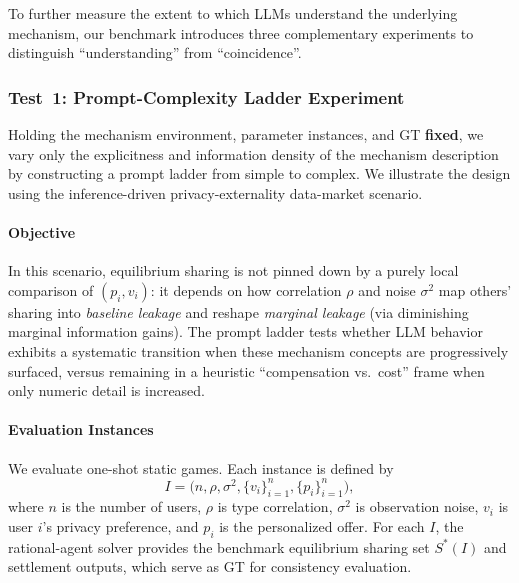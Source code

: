 \documentclass[sigconf,anonymous,review]{acmart}
\theoremstyle{definition}
\begin{document}
To further measure the extent to which LLMs understand the underlying mechanism, our benchmark introduces three complementary experiments to distinguish ``understanding'' from ``coincidence''.

\subsubsection{\textbf{Test~1: Prompt-Complexity Ladder Experiment}}
\label{subsubsec:rq1}

Holding the mechanism environment, parameter instances, and GT \textbf{fixed}, we vary only the explicitness and information density of the mechanism description by constructing a prompt ladder from simple to complex. We illustrate the design using the inference-driven privacy-externality data-market scenario.

\paragraph{\textbf{Objective}}
In this scenario, equilibrium sharing is not pinned down by a purely local comparison of $(p_i,v_i)$: it depends on how correlation $\rho$ and noise $\sigma^2$ map others' sharing into \emph{baseline leakage} and reshape \emph{marginal leakage} (via diminishing marginal information gains). The prompt ladder tests whether LLM behavior exhibits a systematic transition when these mechanism concepts are progressively surfaced, versus remaining in a heuristic ``compensation vs.\ cost'' frame when only numeric detail is increased.

\paragraph{\textbf{Evaluation Instances}}
We evaluate one-shot static games. Each instance is defined by
\[
I=\bigl(n,\rho,\sigma^2,\{v_i\}_{i=1}^n,\{p_i\}_{i=1}^n\bigr),
\]
where $n$ is the number of users, $\rho$ is type correlation, $\sigma^2$ is observation noise, $v_i$ is user $i$'s privacy preference, and $p_i$ is the personalized offer. For each $I$, the rational-agent solver provides the benchmark equilibrium sharing set $S^\ast(I)$ and settlement outputs, which serve as GT for consistency evaluation.
\end{document}
